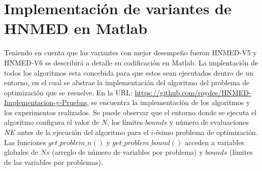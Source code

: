 
\chapter{Implementación de variantes de HNMED en Matlab} %

\label{AppendixA} %


Teniendo en cuenta que las variantes con mejor desempeño fueron HNMED-V5 y HNMED-V6 se describirá a detalle su codificación en Matlab. La implentación de todos los algoritmos esta concebida para que estos sean ejecutados dentro de un entorno, en el cual se abstrae la implementación del algoritmo del problema de optimización que se resuelve. En la URL:  \url{https://github.com/roydes/HNMED-Implementacion-y-Pruebas}, se encuentra la implementación de los algoritmos y los experimentos realizados. Se puede observar que el entorno donde se ejecuta el algoritmo configura el valor de $N$, los límites $bounds$ y número de evaluaciones $NE$ antes de la ejecución del algoritmo para el $i$-ésimo problema de optimización. Las funciones $get\_problem\_n()$ y $get\_problem\_bound()$ acceden a variables globales  de $Ns$ (arreglo de número de variables por problema) y $bounds$ (límites de las variables por problemas).


